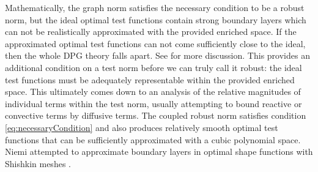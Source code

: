 \documentclass[Dissertation.tex]{subfiles}
\begin{document}
Mathematically, the graph norm satisfies the necessary condition to be a robust norm, but the ideal optimal test functions contain strong boundary
layers which can not be realistically approximated with the provided enriched space.
If the approximated optimal test functions can not come sufficiently close to the ideal, then the whole DPG theory falls apart.
See \cite{PracticalDPG} for more discussion.
This provides an additional condition on a test norm before we can truly call it robust: the ideal test functions must be adequately representable within 
the provided enriched space.
This ultimately comes down to an analysis of the relative magnitudes of individual terms within the test norm, usually attempting to bound reactive or convective terms by diffusive terms.
The coupled robust norm satisfies condition \eqref{eq:necessaryCondition} and also produces relatively smooth optimal test functions that can be sufficiently approximated
with a cubic polynomial space.
Niemi \etal attempted to approximate boundary layers in optimal shape functions with Shishkin meshes \cite{NiemiShishkin,niemi2013discontinuous}.
\end{document}

